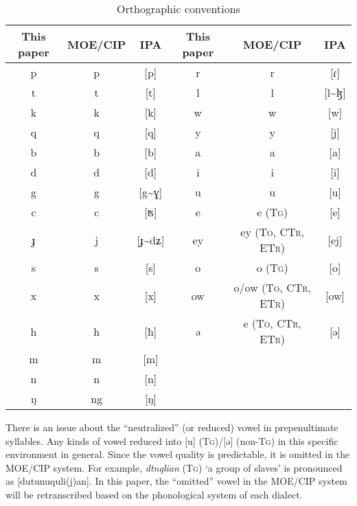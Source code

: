 \documentclass[12pt]{article}
\newcommand{\stg}{\textsc{Tg}\xspace}
\newcommand{\sto}{\textsc{To}\xspace}
\newcommand{\sctr}{\textsc{CTr}\xspace}
\newcommand{\setr}{\textsc{ETr}\xspace}
\begin{document}
\begin{table}[!htbp]
\centering
\caption{Orthographic conventions}
\label{tab:orth}
\begin{tabular}{ccc|ccc}
\hline
This paper & MOE/CIP & IPA    & This paper & MOE/CIP                   & IPA   \\ \hline
p          & p       & [p]    & r          & r                         & [ɾ]   \\
t          & t       & [t]    & l          & l                         & [l\~{ }ɮ] \\
k          & k       & [k]    & w          & w                         & [w]   \\
q          & q       & [q]    & y          & y                         & [j]   \\
b          & b       & [b]    & a          & a                         & [a]   \\
d          & d       & [d]    & i          & i                         & [i]   \\
g          & g       & [g\~{ }ɣ]  & u          & u                         & [u]   \\
c          & c       & [ʦ]   & e          & e (\stg)                  & [e]   \\
ɟ          & j       & [ɟ\~{ }dʑ] & ey         & ey (\sto, \sctr, \setr)   & [ej]  \\
s          & s       & [s]    & o          & o (\stg)                  & [o]   \\
x          & x       & [x]    & ow         & o/ow (\sto, \sctr, \setr) & [ow]  \\
h          & h       & [ħ]    & ə          & e (\sto, \sctr, \setr)    & [ə]   \\
m          & m       & [m]    &            &                           &       \\
n          & n       & [n]    &            &                           &       \\
ŋ          & ng      & [ŋ]    &            &                           &       \\ \hline
\end{tabular}
\end{table}

There is an issue about the ``neutralized'' (or reduced) vowel in prepenultimate syllables. Any kinds of vowel reduced into [u] (\stg)/[ə] (non-\stg) in this specific environment in general. Since the vowel quality is predictable, it is omitted in the MOE/CIP system. For example, \textit{dtnqlian} (\stg) `a group of slaves' is pronounced as [dutunuquli(j)an]. In this paper, the ``omitted'' vowel in the MOE/CIP system will be retranscribed based on the phonological system of each dialect. 
\end{document}

